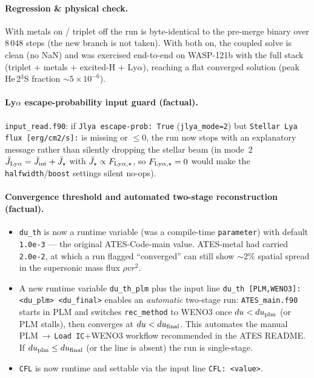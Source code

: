 \documentclass[english,a4paper]{kiseon_memo}
\begin{document}
\paragraph{Regression \& physical check.} With metals on / triplet off the run is
byte-identical to the pre-merge binary over 8\,048 steps (the new branch is not taken).
With both on, the coupled solve is clean (no NaN) and was exercised end-to-end on
WASP-121b with the full stack (triplet $+$ metals $+$ excited-H $+$ Ly$\alpha$),
reaching a flat converged solution (peak He\,2$^3$S fraction $\sim5\times10^{-6}$).

\paragraph{Ly$\alpha$ escape-probability input guard (factual).}
\texttt{input\_read.f90}: if \texttt{Jlya escape-prob: True} (\texttt{jlya\_mode=2}) but
\texttt{Stellar Lya flux [erg/cm2/s]:} is missing or $\le0$, the run now stops with an
explanatory message rather than silently dropping the stellar beam (in mode~2
$\bar J_{\rm Ly\alpha}=\bar J_{\rm int}+\bar J_\star$ with
$\bar J_\star\propto F_{\rm Ly\alpha,\star}$, so $F_{\rm Ly\alpha,\star}=0$ would make
the \texttt{halfwidth}/\texttt{boost} settings silent no-ops).

\paragraph{Convergence threshold and automated two-stage reconstruction (factual).}
\begin{itemize}\itemsep1pt
\item \texttt{du\_th} is now a runtime variable (was a compile-time \texttt{parameter})
  with default \texttt{1.0e-3} --- the original ATES-Code-main value. ATES-metal had
  carried \texttt{2.0e-2}, at which a run flagged ``converged'' can still show
  $\sim$2\% spatial spread in the supersonic mass flux $\rho v r^2$.
\item A new runtime variable \texttt{du\_th\_plm} plus the input line
  \texttt{du\_th [PLM,WENO3]: <du\_plm> <du\_final>} enables an \emph{automatic}
  two-stage run: \texttt{ATES\_main.f90} starts in PLM and switches \texttt{rec\_method}
  to WENO3 once $du<du_{\rm plm}$ (or PLM stalls), then converges at $du<du_{\rm final}$.
  This automates the manual PLM\,$\to$\,\texttt{Load IC}$+$WENO3 workflow recommended in
  the ATES README. If $du_{\rm plm}\le du_{\rm final}$ (or the line is absent) the run
  is single-stage.
\item \texttt{CFL} is now runtime and settable via the input line \texttt{CFL: <value>}.
\end{itemize}
\end{document}
